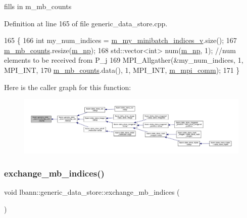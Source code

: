 fills in m\+\_\+mb\+\_\+counts 



Definition at line 165 of file generic\+\_\+data\+\_\+store.\+cpp.


\begin{DoxyCode}
165                                             \{
166   \textcolor{keywordtype}{int} my\_num\_indices = \hyperlink{classlbann_1_1generic__data__store_a41f7fec1f1f3d6568a5765be7a6784eb}{m\_my\_minibatch\_indices\_v}.size();
167   \hyperlink{classlbann_1_1generic__data__store_a8ba0cf1a3d83d835060f45a53d77fbfd}{m\_mb\_counts}.resize(\hyperlink{classlbann_1_1generic__data__store_afcd4f99959c265c8c03dcf8ad3779d85}{m\_np});
168   std::vector<int> num(\hyperlink{classlbann_1_1generic__data__store_afcd4f99959c265c8c03dcf8ad3779d85}{m\_np}, 1); \textcolor{comment}{//num elements to be received from P\_j}
169   MPI\_Allgather(&my\_num\_indices, 1, MPI\_INT,
170                  \hyperlink{classlbann_1_1generic__data__store_a8ba0cf1a3d83d835060f45a53d77fbfd}{m\_mb\_counts}.data(), 1, MPI\_INT, \hyperlink{classlbann_1_1generic__data__store_ae2d2d61d5d766a7f525eedcb05e0dbf6}{m\_mpi\_comm});
171 \}
\end{DoxyCode}
Here is the caller graph for this function\+:\nopagebreak
\begin{figure}[H]
\begin{center}
\leavevmode
\includegraphics[width=350pt]{classlbann_1_1generic__data__store_abd5bf0321c063996369e1e2659bd99aa_icgraph}
\end{center}
\end{figure}
\mbox{\label{classlbann_1_1generic__data__store_aa0ef8d7528f6775d47641ffe5ac229da}} 
\subsubsection{\texorpdfstring{exchange\+\_\+mb\+\_\+indices()}{exchange\_mb\_indices()}}
{\footnotesize\ttfamily void lbann\+::generic\+\_\+data\+\_\+store\+::exchange\+\_\+mb\+\_\+indices (\begin{DoxyParamCaption}{ }\end{DoxyParamCaption})\hspace{0.3cm}{\ttfamily [protected]}}



